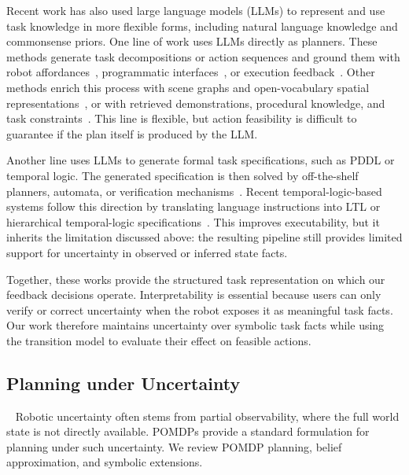 Recent work has also used large language models (LLMs) to represent and use task knowledge in more flexible forms, including natural language knowledge and commonsense priors. One line of work uses LLMs directly as planners. These methods generate task decompositions or action sequences and ground them with robot affordances~\cite{ahn2022can,huang2022inner}, programmatic interfaces~\cite{singh2023progprompt,liang2023code}, or execution feedback~\cite{ding2023task}. Other methods enrich this process with scene graphs and open-vocabulary spatial representations~\cite{gu2024conceptgraphs,leanza2025conceptbot}, or with retrieved demonstrations, procedural knowledge, and task constraints~\cite{singh2025adaptbot,zhouenhancing,xu2024p,wang2025instructrag,kumar2026open}. This line is flexible, but action feasibility is difficult to guarantee if the plan itself is produced by the LLM.

Another line uses LLMs to generate formal task specifications, such as PDDL or temporal logic. The generated specification is then solved by off-the-shelf planners, automata, or verification mechanisms~\cite{huang2023voxposer,dai2024optimal,liu2025delta,paulius2025bootstrapping,quartey2025verifiably}. Recent temporal-logic-based systems follow this direction by translating language instructions into LTL or hierarchical temporal-logic specifications~\cite{xu2025nl2hltl2plan,rabiei2025ltlcodegen,wu2025selp,li2025automatic,hu2026llm}. This improves executability, but it inherits the limitation discussed above: the resulting pipeline still provides limited support for uncertainty in observed or inferred state facts. 

Together, these works provide the structured task representation on which our feedback decisions operate. Interpretability is essential because users can only verify or correct uncertainty when the robot exposes it as meaningful task facts. Our work therefore maintains uncertainty over symbolic task facts while using the transition model to evaluate their effect on feasible actions.

\subsection{Planning under Uncertainty}~\label{rel:PlanningUncertainty}
Robotic uncertainty often stems from partial observability, where the full world state is not directly available. POMDPs provide a standard formulation for planning under such uncertainty. We review POMDP planning, belief approximation, and symbolic extensions.

